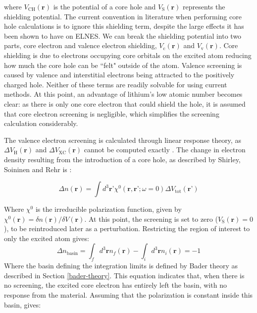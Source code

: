 where $V_{\mathrm{CH}}(\textbf{r})$ is the potential of a core hole and  $V_{\mathrm{S}}(\textbf{r})$ represents the shielding potential.  The current convention in literature when performing core hole calculations is to ignore this shielding term, despite the large effects it has been shown to have on ELNES.  We can break the shielding potential into two parts, core electron and valence electron shielding, $V_{\mathrm{c}}(\textbf{r})$ and  $V_{\mathrm{v}}(\textbf{r})$. Core shielding is due to electrons occupying core orbitals on the excited atom reducing how much the core hole can be ``felt" outside of the atom.  Valence screening is caused by valence and interstitial electrons being attracted to the positively charged hole.  Neither of these terms are readily solvable for using current methods.  At this point, an advantage of lithium's low atomic number becomes clear: as there is only one core electron that could shield the hole, it is assumed that core electron screening is negligible, which simplifies the screening calculation considerably.  

The valence electron screening is calculated through linear response theory, as  $\Delta V_{\mathrm{H}}(\textbf{r})$ and $\Delta V_{\mathrm{XC}}(\textbf{r})$ cannot be computed exactly  \cite{shirley_modeling_2005}.  The change in electron density resulting from the introduction of a core hole, as described by Shirley, Soininen and Rehr is \cite{shirley_modeling_2005}:

\begin{equation}
\Delta n(\textbf{r}) = \int d^3 \textbf{r'} \chi^0(\textbf{r},\textbf{r'}; \omega = 0)\Delta V_{\mathrm{tot}}(\textbf{r'})
\end{equation}

Where $\chi^0$ is the irreducible polarization function, given by $\chi^0(\textbf{r}) = \delta n(\textbf{r}) /  \delta V(\textbf{r})$.  At this point, the screening is set to zero ($V_{\mathrm{S}}(\textbf{r})=0$), to be reintroduced later as a perturbation.  Restricting the region of interest to only the excited atom gives:
\begin{equation}
\Delta n _{\mathrm{basin}} = \int_{f}d^3\textbf{r} n_{f}(\textbf{r}) - \int_{i}d^3\textbf{r} n_i(\textbf{r})= -1
\label{density_calc}
\end{equation}
Where the basin defining the integration limits is defined by Bader theory as described in Section \ref{bader-theory}. This equation indicates that, when there is no screening,  the excited core electron has entirely left the basin, with no response from the material. Assuming that the polarization is constant inside this basin, gives: 


